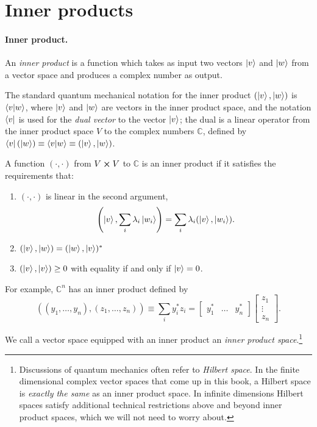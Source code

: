 \section{Inner products}

\paragraph{Inner product.} An \emph{inner product} is a function which takes as
input two vectors $\ket{v}$ and $\ket{w}$ from a vector space and produces a
complex number as output.

The standard quantum mechanical notation for the inner product $(\ket{v},
\ket{w})$ is $\braket{v}{w}$, where $\ket{v}$ and $\ket{w}$ are vectors in the
inner product space, and the notation $\bra{v}$ is used for the \emph{dual
vector} to the vector $\ket{v}$; the dual is a linear operator from the inner
product space $V$ to the complex numbers $\mathbb{C}$, defined by
$\bra{v}(\ket{w}) \equiv \braket{v}{w} \equiv (\ket{v}, \ket{w})$.

A function $(\cdot, \cdot)$ from $V \cross V$ to $\mathbb{C}$ is an inner
product if it satisfies the requirements that: \begin{enumerate}
  \item $(\cdot, \cdot)$ is linear in the second argument, \begin{equation}
      \left(\ket{v}, \sum_i \lambda_i\ket{w_i}\right) = \sum_i
      \lambda_i(\ket{v}, \ket{w_i}).
    \end{equation}
  \item $(\ket{v}, \ket{w}) = (\ket{w}, \ket{v})^*$
  \item $(\ket{v}, \ket{v}) \geq 0$ with equality if and only if $\ket{v} = 0$.
\end{enumerate}

For example, $\mathbb{C}^n$ has an inner product defined by \begin{equation}
  ((y_1, \ldots, y_n), (z_1, \ldots, z_n)) \equiv \sum_i y_i^*z_i =
  \begin{bmatrix}y_1^* & \dots & y_n^*\end{bmatrix}
  \begin{bmatrix}z_1 \\ \vdots \\ z_n\end{bmatrix}.
\end{equation}

We call a vector space equipped with an inner product an \emph{inner product
space}.\footnote{Discussions of quantum mechanics often refer to \emph{Hilbert
space}. In the finite dimensional complex vector spaces that come up in this
book, a Hilbert space is \emph{exactly the same} as an inner product space.
In infinite dimensions Hilbert spaces satisfy additional technical restrictions
above and beyond inner product spaces, which we will not need to worry about.}


